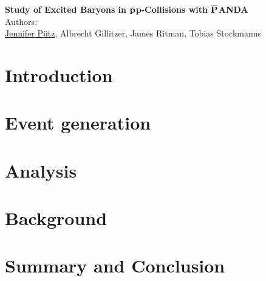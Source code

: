 \documentclass[a4paper, 11pt, twoside]{scrreprt}
\begin{document}
	\pagestyle{fancy}
	\begin{titlepage}
		\thispagestyle{empty}
		\begin{center}
			\textbf{\Huge{Study of Excited \cascade Baryons in $\bar{\textnormal{\textbf{p}}}$p-Collisions with $\overline{\textnormal{\textbf{P}}}$ANDA}}\vspace{1cm}\\
			\Large{Authors:}\vspace{0.3cm}\\
			\LARGE{\underline{Jennifer 
			      P\"{u}tz}, Albrecht Gillitzer, James Ritman, Tobias Stockmanns\vspace{2cm}}
		\end{center}\vspace{1cm}

	\end{titlepage}
	\thispagestyle{empty}
	
	
	
	\setcounter{page}{0}
	\tableofcontents
	\newpage
	\setcounter{page}{1}
	
	\linenumbers
	
	\chapter{Introduction}
		
	
	\chapter{Event generation}
		
	
	\chapter{Analysis}
		
	
	\chapter{Background}
		
	
	\chapter{Summary and Conclusion}
		
\end{document}

